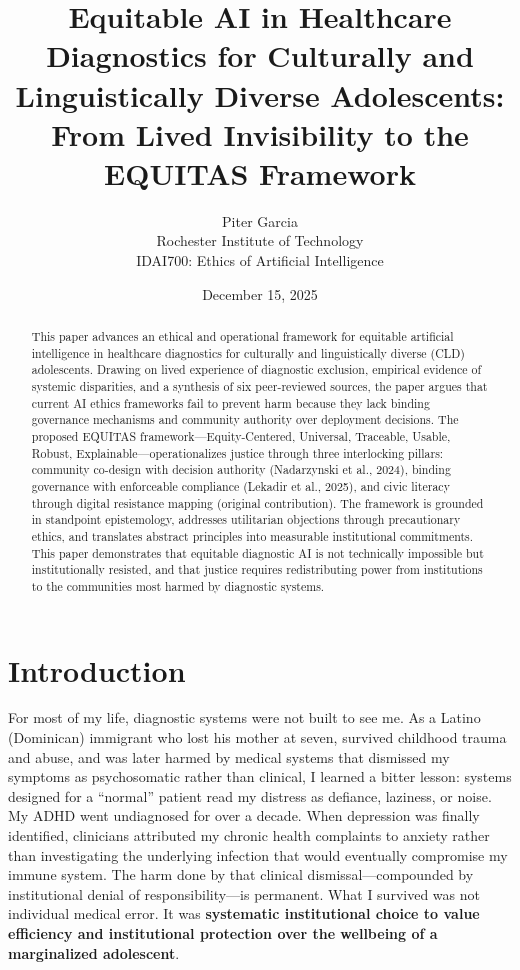 \documentclass[12pt,a4paper]{article}
\title{\textbf{Equitable AI in Healthcare Diagnostics for Culturally and Linguistically Diverse Adolescents:\\From Lived Invisibility to the EQUITAS Framework}}
\author{Piter Garcia\\Rochester Institute of Technology\\IDAI700: Ethics of Artificial Intelligence}
\date{December 15, 2025}
\begin{document}
\maketitle

\begin{abstract}
This paper advances an ethical and operational framework for equitable artificial intelligence in healthcare diagnostics for culturally and linguistically diverse (CLD) adolescents. Drawing on lived experience of diagnostic exclusion, empirical evidence of systemic disparities, and a synthesis of six peer-reviewed sources, the paper argues that current AI ethics frameworks fail to prevent harm because they lack binding governance mechanisms and community authority over deployment decisions. The proposed EQUITAS framework---Equity-Centered, Universal, Traceable, Usable, Robust, Explainable---operationalizes justice through three interlocking pillars: community co-design with decision authority (Nadarzynski et al., 2024), binding governance with enforceable compliance (Lekadir et al., 2025), and civic literacy through digital resistance mapping (original contribution). The framework is grounded in standpoint epistemology, addresses utilitarian objections through precautionary ethics, and translates abstract principles into measurable institutional commitments. This paper demonstrates that equitable diagnostic AI is not technically impossible but institutionally resisted, and that justice requires redistributing power from institutions to the communities most harmed by diagnostic systems.
\end{abstract}

\newpage
\tableofcontents
\newpage

\section{Introduction}

For most of my life, diagnostic systems were not built to see me. As a Latino (Dominican) immigrant who lost his mother at seven, survived childhood trauma and abuse, and was later harmed by medical systems that dismissed my symptoms as psychosomatic rather than clinical, I learned a bitter lesson: systems designed for a ``normal'' patient read my distress as defiance, laziness, or noise. My ADHD went undiagnosed for over a decade. When depression was finally identified, clinicians attributed my chronic health complaints to anxiety rather than investigating the underlying infection that would eventually compromise my immune system. The harm done by that clinical dismissal—compounded by institutional denial of responsibility—is permanent. What I survived was not individual medical error. It was \textbf{systematic institutional choice to value efficiency and institutional protection over the wellbeing of a marginalized adolescent}.
\end{document}
